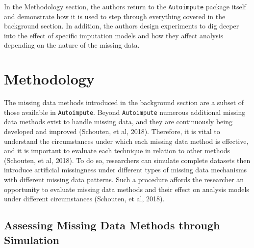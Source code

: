 \documentclass[12pt,oneside]{chicagocapstone}
\begin{document}
In the Methodology section, the authors return to the
\texttt{Autoimpute} package itself and demonstrate how it is used to
step through everything covered in the background section. In addition,
the authors design experiments to dig deeper into the effect of specific
imputation models and how they affect analysis depending on the nature
of the missing data.

\hypertarget{methodology}{\chapter*{Methodology}\label{methodology}}

The missing data methods introduced in the background section are a
subset of those available in \texttt{Autoimpute}. Beyond
\texttt{Autoimpute} numerous additional missing data methods exist to
handle missing data, and they are continuously being developed and
improved (Schouten, et al, 2018). Therefore, it is vital to understand
the circumstances under which each missing data method is effective, and
it is important to evaluate each technique in relation to other methods
(Schouten, et al, 2018). To do so, researchers can simulate complete
datasets then introduce artificial missingness under different types of
missing data mechanisms with different missing data patterns. Such a
procedure affords the researcher an opportunity to evaluate missing data
methods and their effect on analysis models under different
circumstances (Schouten, et al, 2018).

\hypertarget{methodology}{\section*{Assessing Missing Data Methods
through Simulation}\label{methodology}}
\end{document}
